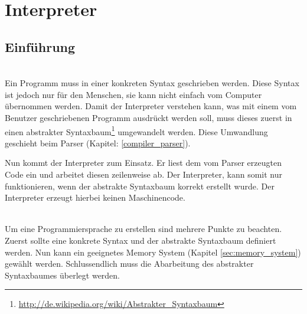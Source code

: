 

\chapter{Interpreter}

\section{Einführung}




\\

Ein Programm muss in einer konkreten Syntax geschrieben werden. Diese Syntax ist jedoch nur für den Menschen, sie kann nicht einfach vom Computer übernommen werden. Damit der Interpreter verstehen kann, was mit einem vom Benutzer geschriebenen Programm ausdrückt werden soll, muss dieses zuerst in einen abstrakter Syntaxbaum\footnote{\url{http://de.wikipedia.org/wiki/Abstrakter_Syntaxbaum}} umgewandelt werden. Diese Umwandlung geschieht beim Parser (Kapitel: \ref{compiler_parser}).

Nun kommt der Interpreter zum Einsatz. Er liest dem vom Parser erzeugten Code ein und arbeitet diesen zeilenweise ab. Der Interpreter, kann somit nur funktionieren, wenn der abstrakte Syntaxbaum korrekt erstellt wurde. Der Interpreter erzeugt hierbei keinen Maschinencode.

\\
Um eine Programmiersprache zu erstellen sind mehrere Punkte zu beachten. Zuerst sollte eine konkrete Syntax und der abstrakte Syntaxbaum definiert werden. Nun kann ein geeignetes Memory System (Kapitel \ref{sec:memory_system}) gewählt werden. Schlussendlich muss die Abarbeitung des abstrakter Syntaxbaumes überlegt werden.


